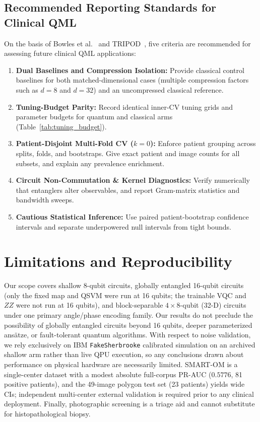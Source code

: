 \documentclass[conference]{IEEEtran}
\begin{document}
\subsection{Recommended Reporting Standards for Clinical QML}
On the basis of Bowles et al.~\cite{bowles2024better} and TRIPOD~\cite{collins2015transparent}, five criteria are recommended for assessing future clinical QML applications:
\begin{enumerate}
    \item \textbf{Dual Baselines and Compression Isolation:} Provide classical control baselines for both matched-dimensional cases (multiple compression factors such as $d=8$ and $d=32$) and an uncompressed classical reference.
    \item \textbf{Tuning-Budget Parity:} Record identical inner-CV tuning grids and parameter budgets for quantum and classical arms (Table~\ref{tab:tuning_budget}).
    \item \textbf{Patient-Disjoint Multi-Fold CV ($k=0$):} Enforce patient grouping across splits, folds, and bootstraps. Give exact patient and image counts for all subsets, and explain any prevalence enrichment.
    \item \textbf{Circuit Non-Commutation \& Kernel Diagnostics:} Verify numerically that entanglers alter observables, and report Gram-matrix statistics and bandwidth sweeps.
    \item \textbf{Cautious Statistical Inference:} Use paired patient-bootstrap confidence intervals and separate underpowered null intervals from tight bounds.
\end{enumerate}

\section{Limitations and Reproducibility}
Our scope covers shallow 8-qubit circuits, globally entangled 16-qubit circuits (only the fixed map and QSVM were run at 16 qubits; the trainable VQC and $ZZ$ were not run at 16 qubits), and block-separable $4 \times 8$-qubit (32-D) circuits under one primary angle/phase encoding family. Our results do not preclude the possibility of globally entangled circuits beyond 16 qubits, deeper parameterized ans{\"a}tze, or fault-tolerant quantum algorithms. With respect to noise validation, we rely exclusively on IBM \texttt{FakeSherbrooke} calibrated simulation on an archived shallow arm rather than live QPU execution, so any conclusions drawn about performance on physical hardware are necessarily limited. SMART-OM is a single-center dataset with a modest absolute full-corpus PR-AUC ($0.5776$, 81 positive patients), and the 49-image polygon test set (23 patients) yields wide CIs; independent multi-center external validation is required prior to any clinical deployment. Finally, photographic screening is a triage aid and cannot substitute for histopathological biopsy.
\end{document}
